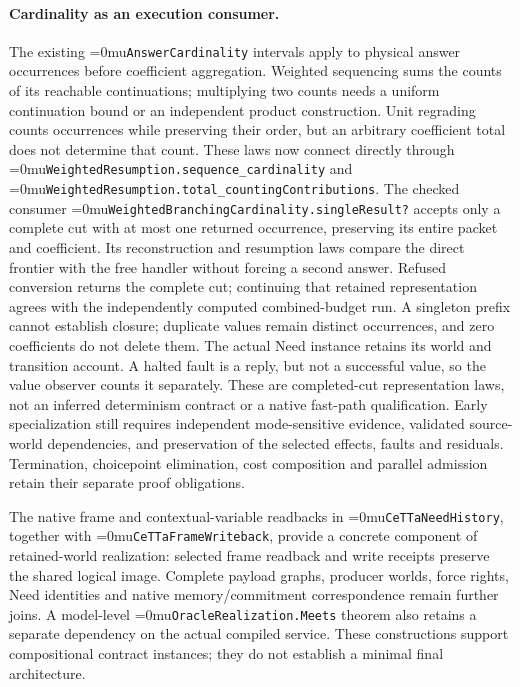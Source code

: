 \documentclass[11pt]{article}
\newcommand{\leanname}[1]{\textup{\Urlmuskip=0mu\relax\nolinkurl{#1}}}
\theoremstyle{definition}
\theoremstyle{remark}
\begin{document}
\paragraph{Cardinality as an execution consumer.}
The existing \leanname{AnswerCardinality} intervals apply to physical answer
occurrences before coefficient aggregation. Weighted sequencing sums the
counts of its reachable continuations; multiplying two counts needs a uniform
continuation bound or an independent product construction. Unit regrading
counts occurrences while preserving their order, but an arbitrary coefficient
total does not determine that count. These laws now connect directly through
\leanname{WeightedResumption.sequence_cardinality} and
\leanname{WeightedResumption.total_countingContributions}.
The checked consumer \leanname{WeightedBranchingCardinality.singleResult?}
accepts only a complete cut with at most one returned occurrence, preserving
its entire packet and coefficient. Its reconstruction and resumption laws
compare the direct frontier with the free handler without forcing a second
answer. Refused conversion returns the complete cut; continuing that retained
representation agrees with the independently computed combined-budget run.
A singleton prefix cannot establish closure; duplicate values remain
distinct occurrences, and zero coefficients do not delete them.
The actual Need instance retains its world and transition account. A halted
fault is a reply, but not a successful value, so the value observer counts it
separately. These are completed-cut representation laws, not an inferred
determinism contract or a native fast-path qualification. Early specialization
still requires independent mode-sensitive evidence, validated source-world
dependencies, and preservation of the selected effects, faults and residuals.
Termination, choicepoint elimination, cost composition and parallel admission
retain their separate proof obligations.

The native frame and contextual-variable readbacks in
\leanname{CeTTaNeedHistory}, together with \leanname{CeTTaFrameWriteback},
provide a concrete component of retained-world realization: selected frame
readback and write receipts preserve the shared logical image. Complete
payload graphs, producer worlds, force rights, Need identities and native
memory/commitment correspondence remain further joins. A model-level
\leanname{OracleRealization.Meets} theorem also retains a separate dependency
on the actual compiled service. These constructions support compositional
contract instances; they do not establish a minimal final architecture.
\end{document}

